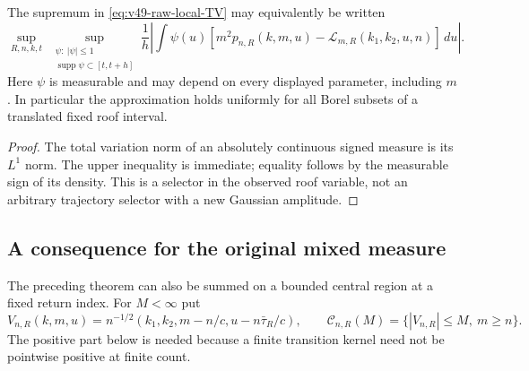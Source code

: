 \begin{corollary}
\label{cor:v49-roof-selector-TV}
The supremum in \eqref{eq:v49-raw-local-TV} may equivalently be
written
\begin{equation}\label{eq:v49-selector-dual}
 \sup_{R,n,k,t}\ \sup_{\substack{\psi:\ |\psi|\le1\\
                                \operatorname{supp}\psi\subset[t,t+h]}}
 \frac1h\left|\int\psi(u)
       [m^2p_{n,R}(k,m,u)-\mathcal L_{m,R}(k_1,k_2,u,n)]\,du\right|.
\end{equation}
Here $\psi$ is measurable and may depend on every displayed parameter,
including $m$. In particular the approximation holds uniformly for
all Borel subsets of a translated fixed roof interval.
\end{corollary}
\begin{proof}
The total variation norm of an absolutely continuous signed measure
is its $L^1$ norm. The upper inequality is immediate; equality follows
by the measurable sign of its density. This is a selector in the
observed roof variable, not an arbitrary trajectory selector with a
new Gaussian amplitude.
\end{proof}

\subsection{A consequence for the original mixed measure}
The preceding theorem can also be summed on a bounded central region
at a fixed return index. For $M<\infty$ put
\[
 V_{n,R}(k,m,u)=
       n^{-1/2}(k_1,k_2,m-n/c,u-n\bar\tau_R/c),
 \qquad \mathcal C_{n,R}(M)=\{|V_{n,R}|\le M,\ m\ge n\}.
\]
The positive part below is needed because a finite transition kernel
need not be pointwise positive at finite count.

